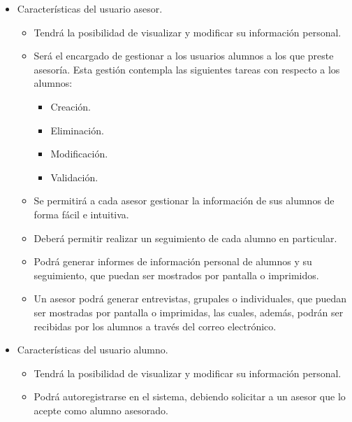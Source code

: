 \begin{itemize}
   \item Características del usuario asesor.
      \begin{itemize}
         \item Tendrá la posibilidad de visualizar y modificar su información
         personal.
         \item Será el encargado de gestionar a los usuarios alumnos a los que
         preste asesoría. Esta gestión contempla las siguientes tareas con
         respecto a los alumnos:
         \begin{itemize}
            \item Creación.
            \item Eliminación.
            \item Modificación.
            \item Validación.
         \end{itemize}
         \item Se permitirá a cada asesor gestionar la información de sus
         alumnos de forma fácil e intuitiva.
         \item Deberá permitir realizar un seguimiento de cada alumno en
         particular.
         \item Podrá generar informes de información personal de alumnos y su
         seguimiento, que puedan ser mostrados por pantalla o imprimidos.
         \item Un asesor podrá generar entrevistas, grupales o individuales, que
         puedan ser mostradas por pantalla o imprimidas, las cuales, además,
         podrán ser recibidas por los alumnos a través del correo electrónico.
      \end{itemize}

   \item Características del usuario alumno.
      \begin{itemize}
         \item Tendrá la posibilidad de visualizar y modificar su información
         personal.
         \item Podrá autoregistrarse en el sistema, debiendo solicitar
         a un asesor que lo acepte como alumno asesorado.
      \end{itemize}
\end{itemize}

